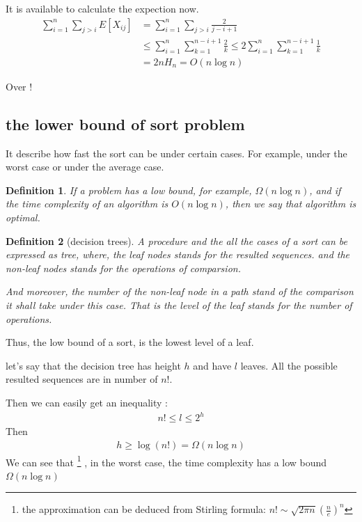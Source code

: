 \documentclass[a4paper, 10pt]{ctexart} %
\newtheorem{definition}{Definition}
\begin{document}
It is available to calculate the expection now. 
\begin{align*}
    \sum_{i=1} ^{n} \sum_{ j >  i }  E \left[ X_{ij} \right] & 
    = \sum_{i=1} ^{n}\sum_{j > i}  \frac{2}{j - i  +1} \\
    & \le \sum_{ i = 1}  ^{n} \sum_{k=1} ^{n  - i + 1} \frac{2}{k} \le 2 \sum_{i=1} ^{n} \sum_{ k =1} ^{n - i  + 1} \frac{1}{k} \\
    & = 2n H_{n} = O\left( n \log n\right)
\end{align*}

Over ! 

\subsection{the lower bound of sort problem}
It describe how fast the sort can be under certain cases.
For example, under the worst case or under the average case.

\begin{definition}
    If a problem has a low bound, for example, $\Omega\left( n\log n\right)$, 
    and if the time complexity of an algorithm is 
    $O \left( n\log n\right)$, 
    then we say that 
    algorithm is optimal.
\end{definition}
\begin{definition}[decision trees]
    A procedure and the all the cases of a sort can be expressed as tree,
    where, the leaf nodes stands for the resulted sequences.
    and the non-leaf nodes stands for the operations of comparsion.

    And moreover, the number of the non-leaf node in a path stand of the 
    comparison it shall take under this case. 
    That is the level of the leaf stands for the number of operations.
\end{definition}

Thus, the low bound of a sort, is the lowest level of a leaf. 


let's say that the decision tree has height $h$ and have $l$ leaves. All the possible resulted sequences are in number of 
$ n !$.

Then we can easily get an inequality :
\begin{align*}
      n ! \le l \le 2 ^{h}
\end{align*}
Then
\begin{align*}
h \ge \log \left( n !\right) = \Omega \left( n \log n\right)
\end{align*} 
We can see that
\footnote{the approximation can be deduced from Stirling formula: $n ! \sim \sqrt{2\pi n} \left( \frac{n}{e}\right) ^{n}$}
, in the worst case, the 
time complexity has a low bound $\Omega \left( n \log n \right)$
\end{document}
